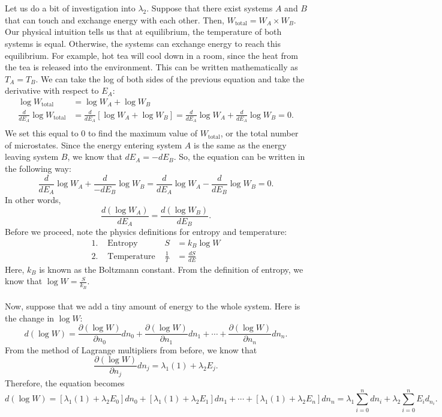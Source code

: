 \documentclass{article}
\begin{document}

\\
\\
Let us do a bit of investigation into $\lambda_2$. Suppose that there exist systems $A$ and $B$ that can touch and exchange energy with each other. Then, $W_{\text{total}} = W_A \times W_B$. Our physical intuition tells us that at equilibrium, the temperature of both systems is equal. Otherwise, the systems can exchange energy to reach this equilibrium. For example, hot tea will cool down in a room, since the heat from the tea is released into the environment. This can be written mathematically as $T_A=T_B$. We can take the log of both sides of the previous equation and take the derivative with respect to $E_A$:
\begin{align*}
    \log W_{\text{total}} &= \log W_A + \log W_B\\
    \frac{d}{dE_A}\log W_{\text{total}} &= \frac{d}{dE_A}[\log W_A + \log W_B] = \frac{d}{dE_A}\log W_A + \frac{d}{dE_A}\log W_B=0.\\
\end{align*}
We set this equal to 0 to find the maximum value of $W_{\text{total}}$, or the total number of microstates. Since the energy entering system $A$ is the same as the energy leaving system $B$, we know that $dE_A=-dE_B$. So, the equation can be written in the following way:
\[\frac{d}{dE_A}\log W_A + \frac{d}{-dE_B}\log W_B=\frac{d}{dE_A}\log W_A - \frac{d}{dE_B}\log W_B=0.\]
In other words,
\[\frac{d (\log W_A)}{dE_A} = \frac{d(\log W_B)}{dE_B}.\]
Before we proceed, note the physics definitions for entropy and temperature:
\begin{align*}
    1.&\text{ Entropy }&S&=k_B \log W\\
    2.&\text{ Temperature }& \frac{1}{T}&=\frac{dS}{dE}
\end{align*}
Here, $k_B$ is known as the Boltzmann constant. From the definition of entropy, we know that $\log W = \frac{S}{k_B}$. 
\\
\\
Now, suppose that we add a tiny amount of energy to the whole system. Here is the change in $\log W$:
\[d(\log W) = \frac{\partial (\log W)}{\partial n_0}dn_0 + \frac{\partial (\log W)}{\partial n_1}dn_1 + \cdots + \frac{\partial (\log W)}{\partial n_n}dn_n.\]
From the method of Lagrange multipliers from before, we know that 
\[\frac{\partial (\log W)}{\partial n_j}dn_j=\lambda_1 (1) + \lambda_2 E_j.\]
Therefore, the equation becomes 
\[d(\log W) = [\lambda_1 (1) + \lambda_2 E_0]dn_0 + [\lambda_1 (1) + \lambda_2 E_1]dn_1 + \cdots + [\lambda_1 (1) + \lambda_2 E_n]dn_n=\lambda_1 \sum_{i=0}^n dn_i + \lambda_2 \sum_{i=0}^n E_i d_{n_i}.\]
\end{document}
